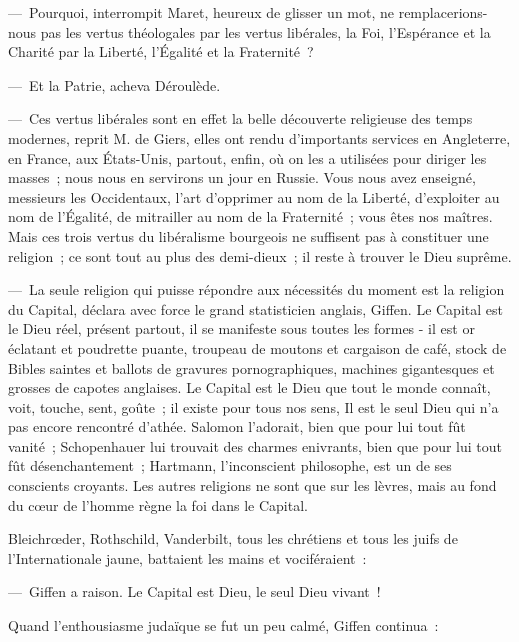 \documentclass[french,twoside]{book} %
\begin{document}
— Pourquoi, interrompit Maret, heureux de glisser un mot, ne remplacerions-nous pas les vertus théologales par les vertus libérales, la Foi, l’Espérance et la Charité par la Liberté, l’Égalité et la Fraternité ?\par
— Et la Patrie, acheva Déroulède.\par
— Ces vertus libérales sont en effet la belle découverte religieuse des temps modernes, reprit M. de Giers, elles ont rendu d’importants services en Angleterre, en France, aux États-Unis, partout, enfin, où on les a utilisées pour diriger les masses ; nous nous en servirons un jour en Russie. Vous nous avez enseigné, messieurs les Occidentaux, l’art d’opprimer au nom de la Liberté, d’exploiter au nom de l’Égalité, de mitrailler au nom de la Fraternité ; vous êtes nos maîtres. Mais ces trois vertus du libéralisme bourgeois ne suffisent pas à constituer une religion ; ce sont tout au plus des demi-dieux ; il reste à trouver le Dieu suprême.\par
— La seule religion qui puisse répondre aux nécessités du moment est la religion du Capital, déclara avec force le grand statisticien anglais, Giffen. Le Capital est le Dieu réel, présent partout, il se manifeste sous toutes les formes - il est or éclatant et poudrette puante, troupeau de moutons et cargaison de café, stock de Bibles saintes et ballots de gravures pornographiques, machines gigantesques et grosses de capotes anglaises. Le Capital est le Dieu que tout le monde connaît, voit, touche, sent, goûte ; il existe pour tous nos sens, Il est le seul Dieu qui n’a pas encore rencontré d’athée. Salomon l’adorait, bien que pour lui tout fût vanité ; Schopenhauer lui trouvait des charmes enivrants, bien que pour lui tout fût désenchantement ; Hartmann, l’inconscient philosophe, est un de ses conscients croyants. Les autres religions ne sont que sur les lèvres, mais au fond du cœur de l’homme règne la foi dans le Capital.\par
Bleichrœder, Rothschild, Vanderbilt, tous les chrétiens et tous les juifs de l’Internationale jaune, battaient les mains et vociféraient :\par
— Giffen a raison. Le Capital est Dieu, le seul Dieu vivant !\par
Quand l’enthousiasme judaïque se fut un peu calmé, Giffen continua :\par
\end{document}

